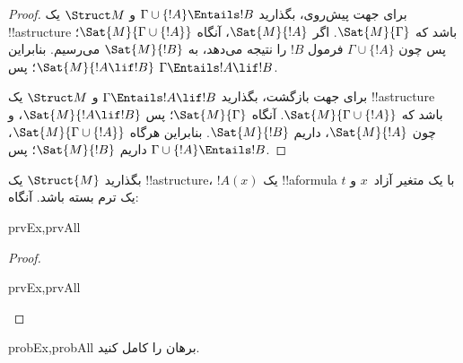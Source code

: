 \documentclass[../../../include/open-logic-section]{subfiles}
\begin{document}
\begin{proof}
برای جهت پیش‌روی، بگذارید $\Gamma \cup \{ !A \} \Entails !B$ و
$\Struct M$ یک !!a{structure} باشد که $\Sat{M}{\Gamma}$. اگر
$\Sat{M}{!A}$، آنگاه $\Sat{M}{\Gamma \cup \{ !A \} }$؛ پس چون
$\Gamma \cup \{ !A \}$ فرمول $!B$ را نتیجه می‌دهد، به
$\Sat{M}{!B}$ می‌رسیم. بنابراین $\Sat{M}{!A \lif !B}$؛ پس
$\Gamma \Entails !A \lif !B$.

برای جهت بازگشت، بگذارید $\Gamma \Entails !A \lif !B$ و $\Struct M$
یک !!a{structure} باشد که $\Sat{M}{\Gamma \cup \{ !A
  \}}$. آنگاه $\Sat{M}{\Gamma}$؛ پس $\Sat{M}{!A \lif !B}$، و چون
$\Sat{M}{!A}$، داریم $\Sat{M}{!B}$. بنابراین هرگاه
$\Sat{M}{\Gamma \cup \{ !A \} }$، داریم $\Sat{M}{!B}$؛ پس
$\Gamma \cup \{ !A \} \Entails !B$.
\end{proof}

\begin{prop}
  بگذارید $\Struct{M}$ یک !!a{structure}، $!A(x)$ یک !!a{formula} با یک
  متغیر آزاد~$x$ و $t$ یک ترم بسته باشد. آنگاه:
  \begin{tagenumerate}{prvEx,prvAll}
  \end{tagenumerate}
\end{prop}

\begin{proof}
  \begin{tagenumerate}{prvEx,prvAll}
  \end{tagenumerate}
\end{proof}

\begin{probtag}{probEx,probAll}
  برهان  را کامل کنید.
\end{probtag}
\end{document}
